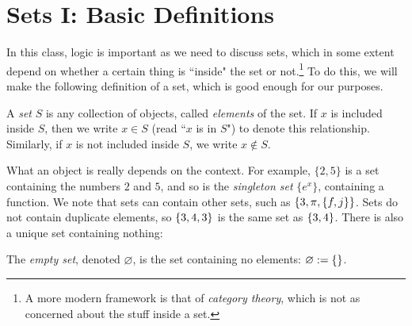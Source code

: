\documentclass{article}
\begin{document}
\section{Sets I: Basic Definitions}
In this class, logic is important as we need to discuss sets, which in some extent depend on whether a certain thing is ``inside" the set or not.\footnote{A more modern framework is that of \textit{category theory}, which is not as concerned about the stuff inside a set.} To do this, we will make the following definition of a set, which is good enough for our purposes.
\begin{definition}
A \textit{set} $S$ is any collection of objects, called \textit{elements} of the set. If $x$ is included inside $S$, then we write $x\in S$ (read ``$x$ is in $S$") to denote this relationship. Similarly, if $x$ is not included inside $S$, we write $x\not\in S$.
\end{definition}
What an object is really depends on the context. For example, $\{2, 5\}$ is a set containing the numbers $2$ and $5$, and so is the \textit{singleton set} $\{e^x\}$, containing a function. We note that sets can contain other sets, such as $\left\{3, \pi, \left\{f, j\right\}\right\}$. Sets do not contain duplicate elements, so $\left\{3, 4, 3\right\}$ is the same set as $\left\{3, 4\right\}$. There is also a unique set containing nothing:
\begin{definition}
The \textit{empty set}, denoted $\varnothing$, is the set containing no elements: $\varnothing := \left\{\right\}$.
\end{definition}
\end{document}
